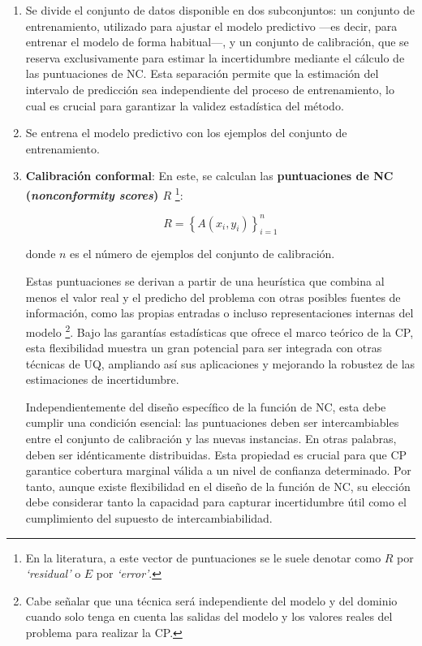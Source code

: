 \begin{enumerate}

    \item Se divide el conjunto de datos disponible en dos subconjuntos: un conjunto de entrenamiento, utilizado para ajustar el modelo predictivo ---es decir, para entrenar el modelo de forma habitual---, y un conjunto de calibración, que se reserva exclusivamente para estimar la incertidumbre mediante el cálculo de las puntuaciones de NC. Esta separación permite que la estimación del intervalo de predicción sea independiente del proceso de entrenamiento, lo cual es crucial para garantizar la validez estadística del método.

    \item Se entrena el modelo predictivo con los ejemplos del conjunto de entrenamiento. 

    \item \textbf{Calibración conformal}: En este, se calculan las \textbf{puntuaciones de NC (\textit{nonconformity scores}) $R$}%
    \footnote{
        En la literatura, a este vector de puntuaciones se le suele denotar como $R$ por \textit{`residual'}
        o $E$ por \textit{`error'}. 
    }:

    $$
    R = \left\{ A(x_i,y_i) \right\}_{i=1}^n
    $$

    donde $n$ es el número de ejemplos del conjunto de calibración.

    Estas puntuaciones se derivan a partir de una heurística que combina al menos el valor real y el predicho del problema con otras posibles fuentes de información, como las propias entradas o incluso representaciones internas del modelo%
    \footnote{
        Cabe señalar que una técnica será independiente del modelo y del dominio cuando solo tenga en cuenta las salidas del modelo y los valores reales del problema para realizar la \acrshort{CP}.
    }. 
    Bajo las garantías estadísticas que ofrece el marco teórico de la \acrshort{CP}, esta flexibilidad muestra un gran potencial para ser integrada con otras técnicas de \acrshort{UQ}, ampliando así sus aplicaciones y mejorando la robustez de las estimaciones de incertidumbre.

    Independientemente del diseño específico de la función de \acrshort{NC}, esta debe cumplir una condición esencial: las puntuaciones deben ser intercambiables entre el conjunto de calibración y las nuevas instancias. En otras palabras, deben ser idénticamente distribuidas. Esta propiedad es crucial para que \acrshort{CP} garantice cobertura marginal válida a un nivel de confianza determinado. Por tanto, aunque existe flexibilidad en el diseño de la función de \acrshort{NC}, su elección debe considerar tanto la capacidad para capturar incertidumbre útil como el cumplimiento del supuesto de intercambiabilidad. 


\end{enumerate}
